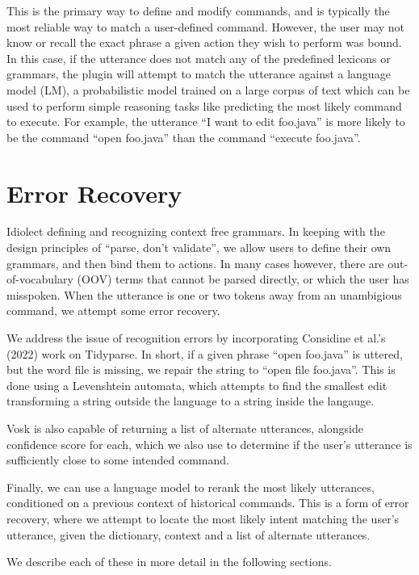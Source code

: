 \documentclass[conference]{IEEEtran}
\begin{document}
This is the primary way to define and modify commands, and is typically the most reliable way to match a user-defined command. However, the user may not know or recall the exact phrase a given action they wish to perform was bound. In this case, if the utterance does not match any of the predefined lexicons or grammars, the plugin will attempt to match the utterance against a language model (LM), a probabilistic model trained on a large corpus of text which can be used to perform simple reasoning tasks like predicting the most likely command to execute. For example, the utterance ``I want to edit foo.java'' is more likely to be the command ``open foo.java'' than the command ``execute foo.java''.

\section{Error Recovery}

Idiolect defining and recognizing context free grammars. In keeping with the design principles of ``parse, don't validate'', we allow users to define their own grammars, and then bind them to actions. In many cases however, there are out-of-vocabulary (OOV) terms that cannot be parsed directly, or which the user has misspoken. When the utterance is one or two tokens away from an unambigious command, we attempt some error recovery.

We address the issue of recognition errors by incorporating Considine et al.'s (2022) work on Tidyparse. In short, if a given phrase ``open foo.java'' is uttered, but the word file is missing, we repair the string to ``open file foo.java''. This is done using a Levenshtein automata, which attempts to find the smallest edit transforming a string outside the language to a string inside the langauge.

Vosk is also capable of returning a list of alternate utterances, alongside confidence score for each, which we also use to determine if the user's utterance is sufficiently close to some intended command.

Finally, we can use a language model to rerank the most likely utterances, conditioned on a previous context of historical commands. This is a form of error recovery, where we attempt to locate the most likely intent matching the user's utterance, given the dictionary, context and a list of alternate utterances.

We describe each of these in more detail in the following sections.
\end{document}
